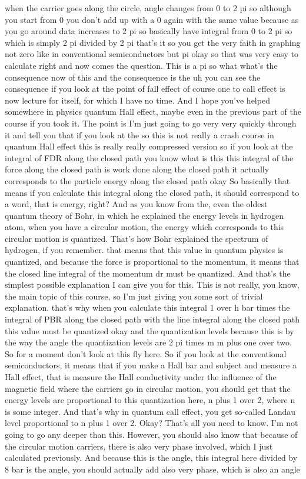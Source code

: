 when the carrier goes along the circle, angle changes from 0 to 2 pi so although you start from 0 you don't add up with a 0 again with the same value because as you go around data increases to 2 pi so basically have integral from 0 to 2 pi so which is simply 2 pi divided by 2 pi that's it so you get the very faith in graphing not zero like in conventional semiconductors but pi okay so that was very easy to calculate right and now comes the question.
This is a pi so what what's the consequence now of this and the consequence is the uh you can see the consequence if you look at the point of fall effect of course one to call effect is now lecture for itself, for which I have no time. And I hope you've helped somewhere in physics quantum Hall effect, maybe even in the previous part of the course if you took it. The point is I'm just going to go very very quickly through it and tell you that if you look at the so this is not really a crash course in quantum Hall effect this is really really compressed version so if you look at the integral of FDR along the closed path you know what is this this integral of the force along the closed path is work done along the closed path it actually corresponds to the particle energy along the closed path okay So basically that means if you calculate this integral along the closed path, it should correspond to a word, that is energy, right? And as you know from the, even the oldest quantum theory of Bohr, in which he explained the energy levels in hydrogen atom, when you have a circular motion, the energy which corresponds to this circular motion is quantized. That's how Bohr explained the spectrum of hydrogen, if you remember. that means that this value in quantum physics is quantized, and because the force is proportional to the momentum, it means that the closed line integral of the momentum dr must be quantized. And that's the simplest possible explanation I can give you for this. This is not really, you know, the main topic of this course, so I'm just giving you some sort of trivial explanation. that's why when you calculate this integral 1 over h bar times the integral of PBR along the closed path with the line integral along the closed path this value must be quantized okay and the quantization levels because this is by the way the angle the quantization levels are 2 pi times m m plus one over two. So for a moment don't look at this fly here. So if you look at the conventional semiconductors, it means that if you make a Hall bar and subject and measure a Hall effect, that is measure the Hall conductivity under the influence of the magnetic field where the carriers go in circular motion, you should get that the energy levels are proportional to this quantization here, n plus 1 over 2, where n is some integer. And that's why in quantum call effect, you get so-called Landau level proportional to n plus 1 over 2. Okay? That's all you need to know. I'm not going to go any deeper than this. However, you should also know that because of the circular motion carriers, there is also very phase involved, which I just calculated previously. And because this is the angle, this integral here divided by 8 bar is the angle, you should actually add also very phase, which is also an angle 